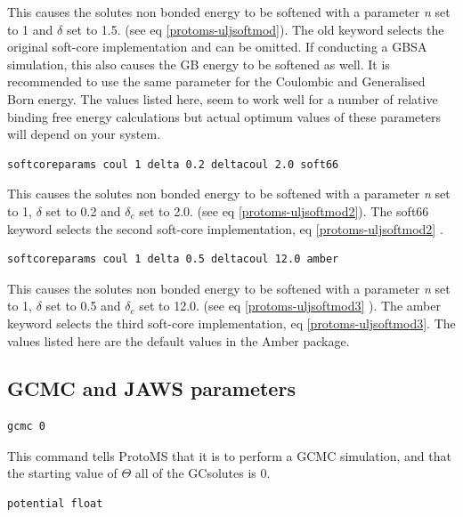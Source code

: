 \documentclass[letterpaper,10pt,english]{manual}
\begin{document}
This causes the solutes non bonded energy to be softened with a parameter \emph{n} set to 1 and $\delta$ set to 1.5. (see eq \eqref{protoms-uljsoftmod}). The old keyword selects the original soft-core implementation and can be omitted. If conducting a GBSA simulation, this also causes the GB energy to be softened as well. It is recommended to use the same parameter for the Coulombic and Generalised Born energy. The values listed here, seem to work well for a number of relative binding free energy calculations but actual optimum values of these parameters will depend on your system.

\begin{Verbatim}[commandchars=@\[\]]
softcoreparams coul 1 delta 0.2 deltacoul 2.0 soft66
\end{Verbatim}

This causes the solutes non bonded energy to be softened with a parameter \emph{n} set to 1, $\delta$ set to 0.2 and $\delta_c$ set to 2.0. (see eq \eqref{protoms-uljsoftmod2}). The soft66 keyword selects the second soft-core implementation, eq \eqref{protoms-uljsoftmod2} .

\begin{Verbatim}[commandchars=@\[\]]
softcoreparams coul 1 delta 0.5 deltacoul 12.0 amber
\end{Verbatim}

This causes the solutes non bonded energy to be softened with a parameter \emph{n} set to 1, $\delta$ set to 0.5 and $\delta_c$  set to 12.0. (see eq \eqref{protoms-uljsoftmod3} ). The amber keyword selects the third soft-core implementation, eq \eqref{protoms-uljsoftmod3}. The values listed here are the default values in the Amber package.


\subsection{GCMC and JAWS parameters}
\begin{Verbatim}[commandchars=@\[\]]
gcmc 0
\end{Verbatim}

This command tells ProtoMS that it is to perform a GCMC simulation, and that the starting value of $\Theta$ all of the GCsolutes is 0.
\begin{Verbatim}[commandchars=@\[\]]
potential float
\end{Verbatim}
\end{document}
